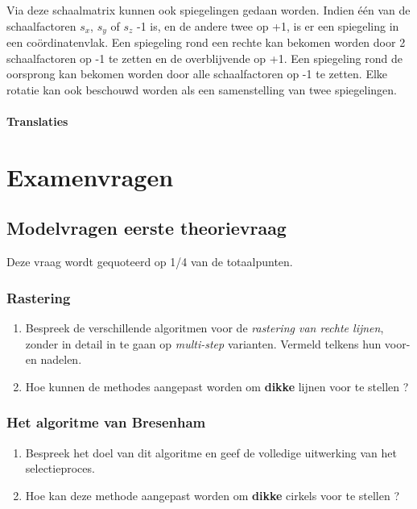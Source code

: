 \documentclass{report}
\begin{document}
	Via deze schaalmatrix kunnen ook spiegelingen gedaan worden. Indien één van de schaalfactoren $s_x$, $s_y$ of $s_z$ -1 is, en de andere twee op +1, is er een spiegeling in een coördinatenvlak. Een spiegeling rond een rechte kan bekomen worden door 2 schaalfactoren op -1 te zetten en de overblijvende op +1. Een spiegeling rond de oorsprong kan bekomen worden door alle schaalfactoren op -1 te zetten.
	Elke rotatie kan ook beschouwd worden als een samenstelling van twee spiegelingen.

	\subsection{Translaties}

	\part{Examenvragen}
	\chapter{Modelvragen eerste theorievraag}
	Deze vraag wordt gequoteerd op 1/4 van de totaalpunten.
	
	\section{Rastering}
	\begin{enumerate}
		\item Bespreek de verschillende algoritmen voor de \textit{rastering van rechte lijnen}, zonder in detail in te gaan op \textit{multi-step} varianten. Vermeld telkens hun voor- en nadelen. 
		
		\item Hoe kunnen de methodes aangepast worden om \textbf{dikke} lijnen voor te stellen ? 
	\end{enumerate}

	\section{Het algoritme van Bresenham}
	\begin{enumerate}
		\item Bespreek het doel van dit algoritme en geef de volledige uitwerking van het selectieproces. 
		
		\item Hoe kan deze methode aangepast worden om \textbf{dikke} cirkels voor te stellen ? 
	\end{enumerate}
\end{document}
